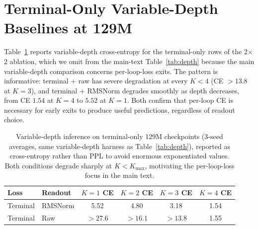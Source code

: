 
\section{Terminal-Only Variable-Depth Baselines at 129M}
\label{app:variable-depth}

Table~\ref{tab:terminal-depth} reports variable-depth cross-entropy for the terminal-only rows of the 2$\times$2 ablation, which we omit from the main-text Table~\ref{tab:depth} because the main variable-depth comparison concerns per-loop-loss exits.
The pattern is informative: terminal + raw has severe degradation at every $K{<}4$ (CE $>13.8$ at $K{=}3$), and terminal + RMSNorm degrades smoothly as depth decreases, from CE $1.54$ at $K{=}4$ to $5.52$ at $K{=}1$.
Both confirm that per-loop CE is necessary for early exits to produce useful predictions, regardless of readout choice.

\begin{table}[h]
\centering
\small
\caption{Variable-depth inference on terminal-only 129M checkpoints (3-seed averages, same variable-depth harness as Table~\ref{tab:depth}), reported as cross-entropy rather than PPL to avoid enormous exponentiated values. Both conditions degrade sharply at $K{<}K_{\max}$, motivating the per-loop-loss focus in the main text.}
\label{tab:terminal-depth}
\begin{tabular}{llcccc}
\toprule
\textbf{Loss} & \textbf{Readout} & $K{=}1$ CE & $K{=}2$ CE & $K{=}3$ CE & $K{=}4$ CE \\
\midrule
Terminal & RMSNorm & 5.52 & 4.80 & 3.18 & 1.54 \\
Terminal & Raw & $>27.6$ & $>16.1$ & $>13.8$ & 1.55 \\
\bottomrule
\end{tabular}
\end{table}

